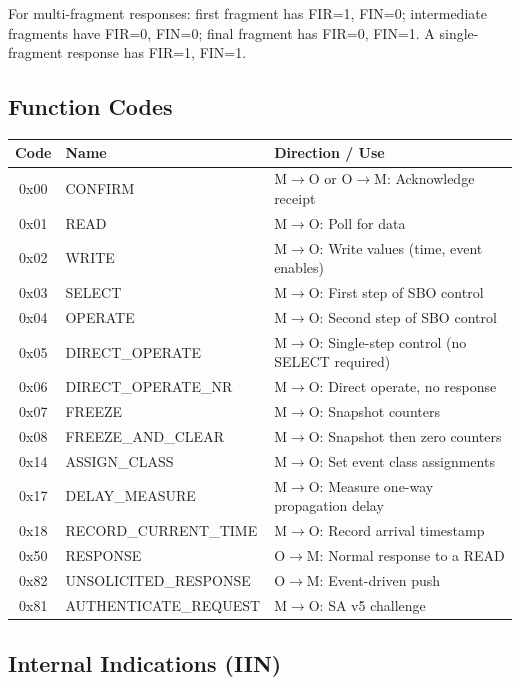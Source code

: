 \documentclass[11pt,twoside]{article}
\begin{document}
For multi-fragment responses: first fragment has FIR=1, FIN=0; intermediate fragments have FIR=0, FIN=0; final fragment has FIR=0, FIN=1. A single-fragment response has FIR=1, FIN=1.

\subsection{Function Codes}

\begin{longtable}{cll}
\toprule
\textbf{Code} & \textbf{Name} & \textbf{Direction / Use}\\
\midrule
\endhead
0x00 & CONFIRM & M$\rightarrow$O or O$\rightarrow$M: Acknowledge receipt \\
0x01 & READ & M$\rightarrow$O: Poll for data \\
0x02 & WRITE & M$\rightarrow$O: Write values (time, event enables) \\
0x03 & SELECT & M$\rightarrow$O: First step of SBO control \\
0x04 & OPERATE & M$\rightarrow$O: Second step of SBO control \\
0x05 & DIRECT\_OPERATE & M$\rightarrow$O: Single-step control (no SELECT required) \\
0x06 & DIRECT\_OPERATE\_NR & M$\rightarrow$O: Direct operate, no response \\
0x07 & FREEZE & M$\rightarrow$O: Snapshot counters \\
0x08 & FREEZE\_AND\_CLEAR & M$\rightarrow$O: Snapshot then zero counters \\
0x14 & ASSIGN\_CLASS & M$\rightarrow$O: Set event class assignments \\
0x17 & DELAY\_MEASURE & M$\rightarrow$O: Measure one-way propagation delay \\
0x18 & RECORD\_CURRENT\_TIME & M$\rightarrow$O: Record arrival timestamp \\
0x50 & RESPONSE & O$\rightarrow$M: Normal response to a READ \\
0x82 & UNSOLICITED\_RESPONSE & O$\rightarrow$M: Event-driven push \\
0x81 & AUTHENTICATE\_REQUEST & M$\rightarrow$O: SA v5 challenge \\
\bottomrule
\end{longtable}

\subsection{Internal Indications (IIN)}
\end{document}
